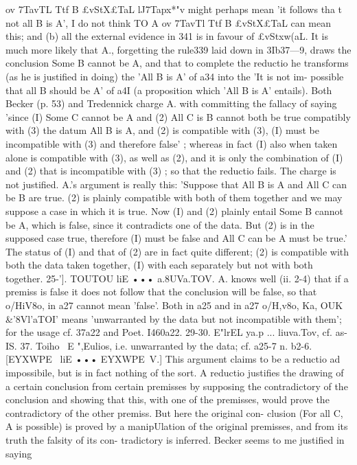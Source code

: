 {{{{{ov 7TavTL Ttf B £vStX£TaL lJ7Tapx*"v might perhaps mean 'it follows
tha t not all B is A', I do not think TO A ov 7TavTl Ttf B £vStX£TaL
can mean this; and (b) all the external evidence in 341 is in favour
of £vStxw(}aL. It is much more likely that A., forgetting the rule339
laid down in 3Ib37---9, draws the conclusion Some B cannot be
A, and that to complete the reductio he transforms (as he is
justified in doing) the 'All B is A' of a34 into the 'It is not im-
possible that all B should be A' of a4I (a proposition which
'All B is A' entails).
Both Becker (p. 53) and Tredennick charge A. with committing
the fallacy of saying 'since (I) Some C cannot be A and (2) All
C is B cannot both be true compatibly with (3) the datum All
B is A, and (2) is compatible with (3), (I) must be incompatible
with (3) and therefore false' ; whereas in fact (I) also when taken
alone is compatible with (3), as well as (2), and it is only the
combination of (I) and (2) that is incompatible with (3) ; so that
the reductio fails. The charge is not justified. A.'s argument is
really this: 'Suppose that All B is A and All C can be B are true.
(2) is plainly compatible with both of them together and we may
suppose a case in which it is true. Now (I) and (2) plainly entail
Some B cannot be A, which is false, since it contradicts one of
the data. But (2) is in the supposed case true, therefore (I) must
be false and All C can be A must be true.' The status of (I) and
that of (2) are in fact quite different; (2) is compatible with both
the data taken together, (I) with each separately but not with
both together.
25-']. TOUTOU liE ••• a.8UVa.TOV. A. knows well (ii. 2-4) that if
a premiss is false it does not follow that the conclusion will be
false, so that o/HiV8o, in a27 cannot mean 'false'. Both in a25 and in
a27 o/H,v8o, Ka, OUK &'8Vl'aTOI' means 'unwarranted by the data but not
incompatible with them'; for the usage cf. 37a22 and Poet. I460a22.
29-30. E"lrEL ya.p ... liuva.Tov, cf. as-IS.
37. Toiho ~E ",Eulios, i.e. unwarranted by the data; cf. a25-7 n.
b2-6. [EYXWPE~ liE ••• EYXWPE~V.] This argument claims to be a
reductio ad impossibile, but is in fact nothing of the sort. A
reductio justifies the drawing of a certain conclusion from certain
premisses by supposing the contradictory of the conclusion and
showing that this, with one of the premisses, would prove the
contradictory of the other premiss. But here the original con-
clusion (For all C, A is possible) is proved by a manipUlation of
the original premisses, and from its truth the falsity of its con-
tradictory is inferred. Becker seems to me justified in saying
}}}}

